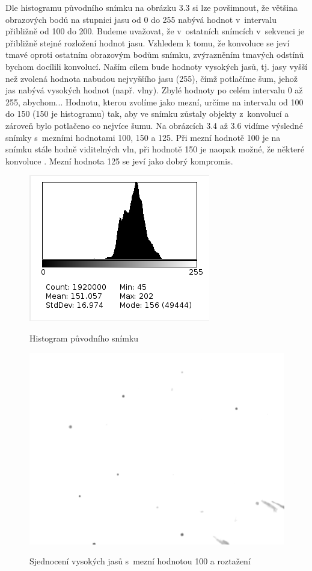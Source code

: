 \documentclass[12pt, a4paper]{report}
\begin{document}
	Dle histogramu původního snímku na obrázku 3.3 si lze povšimnout, že většina obrazových bodů na stupnici jasu od 0 do 255 nabývá hodnot v~intervalu přibližně od 100 do 200. Budeme uvažovat, že v~ostatních snímcích v~sekvenci je přibližně stejné rozložení hodnot jasu. Vzhledem k tomu, že konvoluce se jeví tmavé oproti ostatním obrazovým bodům snímku, zvýrazněním tmavých odstínů bychom docílili  konvolucí. Naším cílem bude  hodnoty vysokých jasů, tj. jasy vyšší než zvolená hodnota nabudou nejvyššího jasu (255), čímž potlačíme šum, jehož jas nabývá vysokých hodnot (např. vlny). Zbylé hodnoty  po celém intervalu 0 až 255, abychom... Hodnotu, kterou zvolíme jako mezní, určíme na intervalu od 100 do 150 (150 je  histogramu) tak, aby ve snímku zůstaly objekty  z~konvolucí a zároveň bylo potlačeno co nejvíce šumu. Na obrázcích 3.4 až 3.6 vidíme výsledné snímky s~mezními hodnotami 100, 150 a 125. Při mezní hodnotě 100 je na snímku stále hodně viditelných vln, při hodnotě 150 je naopak možné, že některé konvoluce . Mezní hodnota 125 se jeví jako dobrý kompromis.
	
	\begin{figure}[!htb]
	\centering
	\includegraphics[scale=0.65]{obrazky/puvodni_histogram.png}
	\label{fig:puvodni_histogram}
	\caption{Histogram původního snímku}
	\end{figure}
	
	\begin{figure}[!htb]
	\centering
	\includegraphics[scale=0.1]{obrazky/roztazeni_jasu_0_100.png}
	\label{fig:jas_0_100}
	\caption{Sjednocení vysokých jasů s~mezní hodnotou 100 a roztažení}
	\end{figure}	
	
\end{document}
